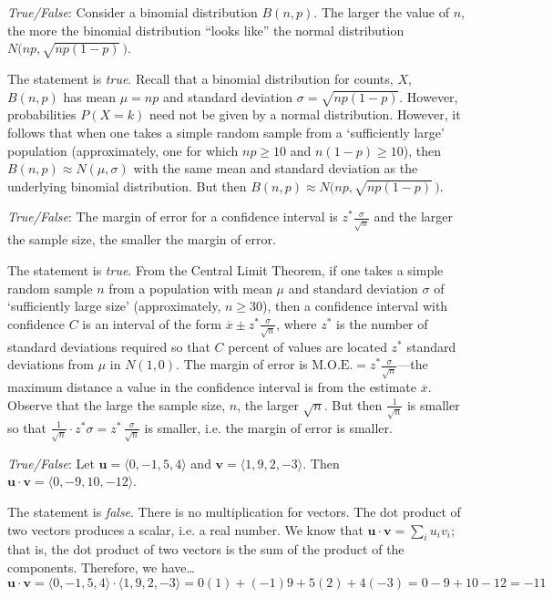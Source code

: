 \documentclass[11pt,letterpaper]{article}
\begin{document}
\quizsol \textit{True/False}: Consider a binomial distribution $B(n, p)$. The larger the value of $n$, the more the binomial distribution ``looks like'' the normal distribution $N\big(np, \sqrt{np(1 - p)}\, \big)$. \pspace

\sol The statement is \textit{true}. Recall that a binomial distribution for counts, $X$, $B(n, p)$ has mean $\mu= np$ and standard deviation $\sigma= \sqrt{np(1 - p)}$. However, probabilities $P(X= k)$ need not be given by a normal distribution. However, it follows that when one takes a simple random sample from a `sufficiently large' population (approximately, one for which $np \geq 10$ and $n(1 - p) \geq 10$), then $B(n, p) \approx N(\mu, \sigma)$ with the same mean and standard deviation as the underlying binomial distribution. But then $B(n, p) \approx N\big(np, \sqrt{np(1 - p)}\, \big)$. \pvspace{1.3cm}



\quizsol \textit{True/False}: The margin of error for a confidence interval is $z^* \frac{\sigma}{\sqrt{n}}$ and the larger the sample size, the smaller the margin of error. \pspace

\sol The statement is \textit{true}. From the Central Limit Theorem, if one takes a simple random sample $n$ from a population with mean $\mu$ and standard deviation $\sigma$ of `sufficiently large size' (approximately, $n \geq 30$), then a confidence interval with confidence $C$ is an interval of the form $\overline{x} \pm z^* \frac{\sigma}{\sqrt{n}}$, where $z^*$ is the number of standard deviations required so that $C$ percent of values are located $z^*$ standard deviations from $\mu$ in $N(1, 0)$. The margin of error is $\text{M.O.E.}= z^* \frac{\sigma}{\sqrt{n}}$---the maximum distance a value in the confidence interval is from the estimate $\overline{x}$. Observe that the large the sample size, $n$, the larger $\sqrt{n}$. But then $\frac{1}{\sqrt{n}}$ is smaller so that $\frac{1}{\sqrt{n}} \cdot z^* \sigma= z^* \, \frac{\sigma}{\sqrt{n}}$ is smaller, i.e. the margin of error is smaller. \pvspace{1.3cm}



\quizsol \textit{True/False}: Let $\mathbf{u}= \langle 0, -1, 5, 4 \rangle$ and $\mathbf{v}= \langle 1, 9, 2, -3 \rangle$. Then $\mathbf{u} \cdot \mathbf{v}= \langle 0, -9, 10, -12 \rangle$. \pspace

\sol The statement is \textit{false}. There is no multiplication for vectors. The dot product of two vectors produces a scalar, i.e. a real number. We know that $\mathbf{u} \cdot \mathbf{v}= \sum_i u_i v_i$; that is, the dot product of two vectors is the sum of the product of the components. Therefore, we have\dots
	\[
	\mathbf{u} \cdot \mathbf{v}= \langle 0, -1, 5, 4 \rangle \cdot \langle 1, 9, 2, -3 \rangle= 0(1) + (-1)9 + 5(2) + 4(-3)= 0 - 9 + 10 - 12= -11
	\] \pvspace{1.3cm}
\end{document}
